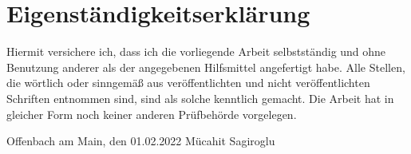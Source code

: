\documentclass[fontsize=12pt,paper=a4,open=any,parskip=half,
  twoside=false,toc=listof,toc=bibliography,fleqn,leqno,
  captions=nooneline,captions=tableabove,british]{scrbook}
\begin{document}
\printbibliography[title=Literaturverzeichnis]



\chapter*{Eigenständigkeitserklärung}

Hiermit versichere ich, dass ich die vorliegende Arbeit selbstständig und ohne Benutzung
anderer als der angegebenen Hilfsmittel angefertigt habe. Alle Stellen, die wörtlich oder
sinngemäß aus veröffentlichten und nicht veröffentlichten Schriften entnommen sind,
sind als solche kenntlich gemacht. Die Arbeit hat in gleicher Form noch keiner anderen
Prüfbehörde vorgelegen.

\vspace{2cm}

Offenbach am Main, den 01.02.2022 \hfill Mücahit Sagiroglu \hspace{2cm}
\end{document}
